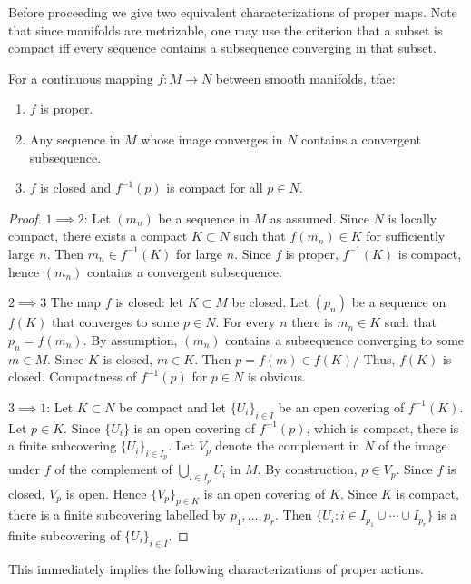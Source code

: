 Before proceeding we give two equivalent characterizations of proper maps. Note that since manifolds are metrizable, one may use the criterion that a subset is compact iff every sequence contains a subsequence converging in that subset.

\begin{lem}[{{\cite[Lem.~6.3.2]{RS1}}}]\label{lem 6.3.2 RS1}
    For a continuous mapping $f:M\to N$ between smooth manifolds, \gls{tfae}:
    \begin{enumerate}
        \item $f$ is proper.
        \item Any sequence in $M$ whose image converges in $N$ contains a convergent subsequence.
        \item $f$ is closed and $f^{-1}(p)$ is compact for all $p\in N$.
    \end{enumerate}
\end{lem}
\begin{proof}
    $1\implies2$: Let $(m_n)$ be a sequence in $M$ as assumed. Since $N$ is locally compact, there exists a compact $K\subset N$ such that $f(m_n)\in K$ for sufficiently large $n$. Then $m_n\in f^{-1}(K)$ for large $n$. Since $f$ is proper, $f^{-1}(K)$ is compact, hence $(m_n)$ contains a convergent subsequence.

    $2\implies3$ The map $f$ is closed: let $K\subset M$ be closed. Let $(p_n)$ be a sequence on $f(K)$ that converges to some $p\in N$. For every $n$ there is $m_n\in K$ such that $p_n=f(m_n)$. By assumption, $(m_n)$ contains a subsequence converging to some $m\in M$. Since $K$ is closed, $m\in K$. Then $p=f(m)\in f(K)$/ Thus, $f(K)$ is closed. Compactness of $f^{-1}(p)$ for $p\in N$ is obvious.

    $3\implies1$: Let $K\subset N$ be compact and let $\{U_i\}_{i\in I}$ be an open covering of $f^{-1}(K)$. Let $p\in K$. Since $\{U_i\}$ is an open covering of $f^{-1}(p)$, which is compact, there is a finite subcovering $\{U_i\}_{i\in I_p}$. Let $V_p$ denote the complement in $N$ of the image under $f$ of the complement of $\bigcup_{i\in I_p}U_i$ in $M$. By construction, $p\in V_p$. Since $f$ is closed, $V_p$ is open. Hence $\{V_p\}_{p\in K}$ is an open covering of $K$. Since $K$ is compact, there is a finite subcovering labelled by $p_1,\ldots,p_r$. Then $\{U_i:i\in I_{p_1}\cup \cdots \cup I_{p_r}\}$ is a finite subcovering of $\{U_i\}_{i\in I}$.
\end{proof}

This immediately implies the following characterizations of proper actions.


